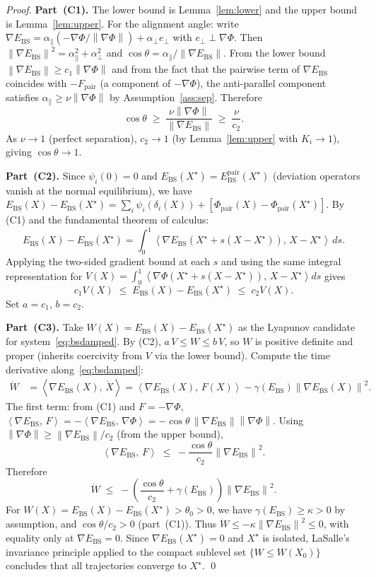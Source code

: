 \documentclass[11pt]{article}
\theoremstyle{definition}
\newcommand{\Xst}{X^{\star}}
\newcommand{\grad}{\nabla}
\newcommand{\Ebs}{E_{\mathrm{BS}}}
\newcommand{\norm}[1]{\left\|#1\right\|}
\newcommand{\inner}[2]{\left\langle #1,\, #2\right\rangle}
\newcommand{\costheta}{\cos\theta}
\begin{document}
\begin{proof}
\textbf{Part~(C1).}
The lower bound is Lemma~\ref{lem:lower} and the upper bound is
Lemma~\ref{lem:upper}.  For the alignment angle: write
$\grad\Ebs = \alpha_\parallel(-\grad\Phi/\norm{\grad\Phi}) + \alpha_\perp e_\perp$
with $e_\perp \perp \grad\Phi$.  Then
$\norm{\grad\Ebs}^2 = \alpha_\parallel^2 + \alpha_\perp^2$ and
$\costheta = \alpha_\parallel / \norm{\grad\Ebs}$.  From the lower bound
$\norm{\grad\Ebs} \ge c_1\norm{\grad\Phi}$ and from the fact that the pairwise
term of $\grad\Ebs$ coincides with $-F_{\mathrm{pair}}$ (a component of
$-\grad\Phi$), the anti-parallel component satisfies
$\alpha_\parallel \ge \nu\norm{\grad\Phi}$ by Assumption~\ref{ass:sep}.
Therefore
\[
  \costheta \;\ge\; \frac{\nu\norm{\grad\Phi}}{\norm{\grad\Ebs}}
                 \;\ge\; \frac{\nu}{c_2}.
\]
As $\nu \to 1$ (perfect separation), $c_2 \to 1$ (by Lemma~\ref{lem:upper} with
$K_i \to 1$), giving $\costheta \to 1$.

\smallskip
\textbf{Part~(C2).}
Since $\psi_i(0) = 0$ and $\Ebs(\Xst) = \Ebs^{\mathrm{pair}}(\Xst)$ (deviation
operators vanish at the normal equilibrium), we have
$\Ebs(X) - \Ebs(\Xst) = \sum_i\psi_i(\delta_i(X)) + [\Phi_{\mathrm{pair}}(X)
- \Phi_{\mathrm{pair}}(\Xst)]$.
By (C1) and the fundamental theorem of calculus:
\[
  \Ebs(X) - \Ebs(\Xst)
  = \int_0^1 \inner{\grad\Ebs(\Xst + s(X-\Xst))}{X-\Xst}\,ds.
\]
Applying the two-sided gradient bound at each $s$ and using the same integral
representation for $V(X) = \int_0^1\inner{\grad\Phi(\Xst+s(X-\Xst))}{X-\Xst}ds$
gives
\[
  c_1 V(X) \;\le\; \Ebs(X)-\Ebs(\Xst) \;\le\; c_2 V(X).
\]
Set $a = c_1$, $b = c_2$.

\smallskip
\textbf{Part~(C3).}
Take $W(X) = \Ebs(X) - \Ebs(\Xst)$ as the Lyapunov candidate for
system~\eqref{eq:bsdamped}.  By (C2), $a\,V\le W \le b\,V$, so $W$ is positive
definite and proper (inherits coercivity from $V$ via the lower bound). Compute the
time derivative along~\eqref{eq:bsdamped}:
\begin{align*}
  \dot{W}
  &= \inner{\grad\Ebs(X)}{\dot{X}}
   = \inner{\grad\Ebs(X)}{F(X)} - \gamma(\Ebs)\norm{\grad\Ebs(X)}^2.
\end{align*}
The first term: from (C1) and $F = -\grad\Phi$,
$\inner{\grad\Ebs}{F} = -\inner{\grad\Ebs}{\grad\Phi}
= -\costheta\,\norm{\grad\Ebs}\norm{\grad\Phi}$.
Using $\norm{\grad\Phi}\ge\norm{\grad\Ebs}/c_2$ (from the upper bound),
\[
  \inner{\grad\Ebs}{F} \;\le\; -\frac{\costheta}{c_2}\norm{\grad\Ebs}^2.
\]
Therefore
\[
  \dot{W} \;\le\; -\!\left(\frac{\costheta}{c_2} + \gamma(\Ebs)\right)
                   \norm{\grad\Ebs}^2.
\]
For $W(X) = \Ebs(X) - \Ebs(\Xst) > \theta_0 > 0$, we have
$\gamma(\Ebs) \ge \kappa > 0$ by assumption, and $\costheta/c_2 > 0$
(part~(C1)).  Thus $\dot{W} \le -\kappa\norm{\grad\Ebs}^2 \le 0$,
with equality only at $\grad\Ebs = 0$.  Since $\grad\Ebs(\Xst)=0$ and
$\Xst$ is isolated, LaSalle's invariance principle applied to the compact
sublevel set $\{W \le W(X_0)\}$ concludes that all trajectories converge to
$\Xst$. \qed
\end{proof}
\end{document}
